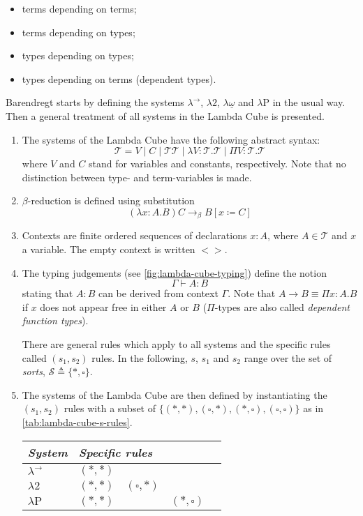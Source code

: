 \documentclass[12pt,toc=bibliography,numbers=noendperiod,
               footnotes=multiple,twoside]{scrartcl}
\begin{document}
\begin{itemize}
\item terms depending on terms;
\item terms depending on types;
\item types depending on types;
\item types depending on terms (dependent types).
\end{itemize}

Barendregt starts by defining the systems \(\lambda^{\rightarrow}\), \(\lambda\textrm{2}\), \(\lambda\underline{\omega}\) and \(\lambda\textrm{P}\) in the usual way. Then a general treatment of all systems in the Lambda Cube is presented.

\begin{enumerate}
\item The systems of the Lambda Cube have the following abstract syntax: \[\mathcal{T} = V \;|\; C \;|\; \mathcal{T}\mathcal{T} \;|\; \lambda V\!\!:\!\mathcal{T}\!.\mathcal{T} \;|\; \Pi V\!\!:\!\mathcal{T}\!.\mathcal{T}\] where \(V\) and \(C\) stand for variables and constants, respectively. Note that no distinction between type- and term-variables is made.
\item \(\beta\)-reduction is defined using substitution \[(\lambda x:A.B)C \rightarrow_\beta B[x \coloneqq C]\]
\item Contexts are finite ordered sequences of declarations \(x:A\), where \(A \in \mathcal{T}\) and \(x\) a variable. The empty context is written \(<>\).
\item The typing judgements (see \cref{fig:lambda-cube-typing}) define the notion \[\Gamma \vdash A:B\] stating that \(A:B\) can be derived from context \(\Gamma\). Note that \(A \rightarrow B \equiv \Pi x:A.B\) if \(x\) does not appear free in either \(A\) or \(B\) (\(\Pi\)-types are also called \emph{dependent function types}).

There are general rules which apply to all systems and the specific rules called \((s_1, s_2)\) rules. In the following, \(s\), \(s_1\) and \(s_2\) range over the set of \emph{sorts}, \(\mathcal{S} \triangleq \{*, \square\}\).
\item The systems of the Lambda Cube are then defined by instantiating the \((s_1, s_2)\) rules with a subset of \(\{(*,*), (\square, *), (*,\square), (\square, \square)\}\) as in \cref{tab:lambda-cube-s-rules}.

\begin{table}[h]
    \centering
    \begin{tabular}{l l l l l}
        \toprule
        \textit{System} & \multicolumn{4}{l}{\textit{Specific rules}}  \\
        \midrule
        \(\lambda^{\rightarrow}\) & \((*,*)\) & & & \\
        \(\lambda\textrm{2}\) & \((*,*)\) & \((\square, *)\) & & \\
        \(\lambda\textrm{P}\) & \((*,*)\) & & \((*,\square)\) & \\


\end{tabular}
\end{table}
\end{enumerate}
\end{document}
